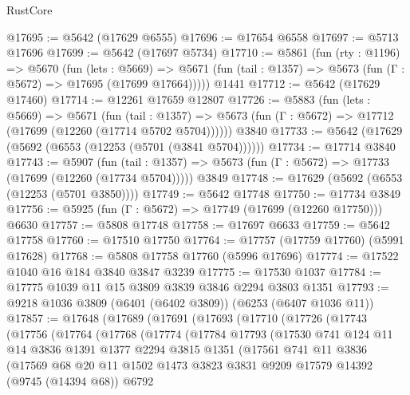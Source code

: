 \begin{lexlean}{RustCore}
\begin{coremodule}
@17695 := @5642 (@17629 @6555)
@17696 := @17654 @6558
@17697 := @5713 @17696
@17699 := @5642 (@17697 @5734)
@17710 := @5861
    (fun (rty : @1196) =>
    @5670
      (fun (lets : @5669) =>
      @5671 (fun (tail : @1357) => @5673 (fun (Γ : @5672) => @17695 (@17699 @17664)))))
    @1441
@17712 := @5642 (@17629 @17460)
@17714 := @12261 @17659 @12807
@17726 := @5883
    (fun (lets : @5669) =>
    @5671
      (fun (tail : @1357) =>
      @5673 (fun (Γ : @5672) => @17712 (@17699 (@12260 (@17714 @5702 @5704))))))
    @3840
@17733 := @5642 (@17629 (@5692 (@6553 (@12253 (@5701 (@3841 @5704))))))
@17734 := @17714 @3840
@17743 := @5907
    (fun (tail : @1357) => @5673 (fun (Γ : @5672) => @17733 (@17699 (@12260 (@17734 @5704)))))
    @3849
@17748 := @17629 (@5692 (@6553 (@12253 (@5701 @3850))))
@17749 := @5642 @17748
@17750 := @17734 @3849
@17756 := @5925 (fun (Γ : @5672) => @17749 (@17699 (@12260 @17750))) @6630
@17757 := @5808 @17748
@17758 := @17697 @6633
@17759 := @5642 @17758
@17760 := @17510 @17750
@17764 := @17757 (@17759 @17760) (@5991 @17628)
@17768 := @5808 @17758 @17760 (@5996 @17696)
@17774 := @17522 @1040 @16 @184 @3840 @3847 @3239
@17775 := @17530 @1037
@17784 := @17775 @1039 @11 @15 @3809 @3839 @3846 @2294 @3803 @1351
@17793 := @9218 @1036 @3809 (@6401 (@6402 @3809)) (@6253 (@6407 @1036 @11))
@17857 := @17648
    (@17689
      (@17691
        (@17693
          (@17710
            (@17726
              (@17743
                (@17756
                  (@17764
                    (@17768
                      (@17774
                        (@17784
                          @17793
                          (@17530
                            @741
                            @124
                            @11
                            @14
                            @3836
                            @1391
                            @1377
                            @2294
                            @3815
                            @1351
                            (@17561
                              @741
                              @11
                              @3836
                              (@17569
                                @68
                                @20
                                @11
                                @1502
                                @1473
                                @3823
                                @3831
                                @9209
                                @17579
                                @14392
                                (@9745 (@14394 @68))
                                @6792

\end{coremodule}
\end{lexlean}
